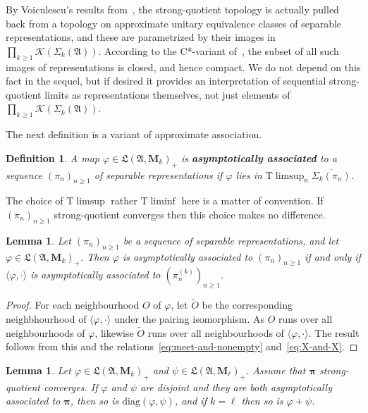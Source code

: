 \documentclass[12pt,a4paper]{article}
\numberwithin{equation}{section}
\newtheorem{lem}[thm]{Lemma}
\newtheorem{dfn}[thm]{Definition}
\theoremstyle{remark}
\renewcommand{\rm}[1]{\mathrm{#1}}
\renewcommand{\cal}[1]{\mathcal{#1}}
\newcommand{\rmM}{\mathbf{M}}
\newcommand{\A}{\mathfrak{A}}
\newcommand{\frL}{\mathfrak{L}}
\renewcommand{\S}{\Sigma}
\renewcommand{\phi}{\varphi}
\newcommand{\ol}[1]{\overline{#1}}
\renewcommand{\t}[1]{\widetilde{#1}}
\newcommand{\bspi}{\boldsymbol{\pi}}
\begin{document}
By Voiculescu's results from~\cite{Voi76}, the strong-quotient topology is actually pulled back from a topology on approximate unitary equivalence classes of separable representations, and these are parametrized by their images in $\prod_{k\ge 1}\cal{K}(\S_k(\A))$.  According to the C*-variant of~\cite[Thm. 1]{AbeEle11}, the subset of all such images of representations is closed, and hence compact.  We do not depend on this fact in the sequel, but if desired it provides an interpretation of sequential strong-quotient limits as representations themselves, not just elements of $\prod_{k\ge 1}\cal{K}(\S_k(\A))$.

The next definition is a variant of approximate association.

\begin{dfn}\label{dfn:asymp-assoc}
A map $\phi \in \frL(\A,\rmM_k)_+$ is \textbf{asymptotically associated} to a sequence $(\pi_n)_{n\ge 1}$ of separable representations if $\phi$ lies in $\rm{T}\limsup_n \ol{\S_k(\pi_n)}$.
\end{dfn}

The choice of $\rm{T}\limsup$ rather $\rm{T}\liminf$ here is a matter of convention.  If $(\pi_n)_{n\ge 1}$ strong-quotient converges then this choice makes no difference.

\begin{lem}\label{lem:strong-quot-for-pairing}
Let $(\pi_n)_{n\ge 1}$ be a sequence of separable representations, and let $\phi \in \frL(\A,\rmM_k)_+$.  Then $\phi$ is asymptotically associated to $(\pi_n)_{n\ge 1}$ if and only if $\langle \phi,\cdot\rangle$ is asymptotically associated to $(\pi_n^{(k)})_{n\ge 1}$. 
\end{lem}

\begin{proof}
For each neighbourhood $O$ of $\phi$, let $\t{O}$ be the corresponding neighbhourhood of $\langle \phi,\cdot\rangle$ under the pairing isomorphism.  As $O$ runs over all neighbourhoods of $\phi$, likewise $\t{O}$ runs over all neighbourhoods of $\langle \phi,\cdot\rangle$.  The result follows from this and the relations~\eqref{eq:meet-and-nonempty} and~\eqref{eq:X-and-X}.
\end{proof}

\begin{lem}\label{lem:diag-and-sum-still-assoc}
Let $\phi \in \frL(\A,\rmM_k)_+$ and $\psi \in \frL(\A,\rmM_\ell)_+$. Assume that $\bspi$ strong-quotient converges.  If $\phi$ and $\psi$ are disjoint and they are both asymptotically associated to $\bspi$, then so is $\rm{diag}(\phi,\psi)$, and if $k=\ell$ then so is $\phi+\psi$.
\end{lem}
\end{document}
